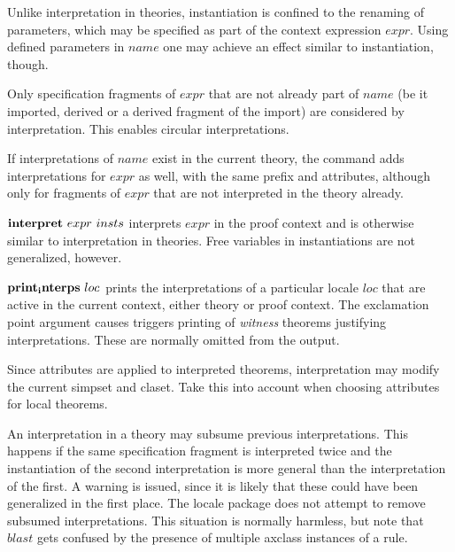 \begin{descr}
  Unlike interpretation in theories, instantiation is confined to the
  renaming of parameters, which may be specified as part of the context
  expression $expr$.  Using defined parameters in $name$ one may
  achieve an effect similar to instantiation, though.

  Only specification fragments of $expr$ that are not already part of
  $name$ (be it imported, derived or a derived fragment of the import)
  are considered by interpretation.  This enables circular
  interpretations.

  If interpretations of $name$ exist in the current theory, the
  command adds interpretations for $expr$ as well, with the same
  prefix and attributes, although only for fragments of $expr$ that
  are not interpreted in the theory already.

\item [${\mathord{\mathbf{interpret}}}~expr~insts$]
  interprets $expr$ in the proof context and is otherwise similar to
  interpretation in theories.  Free variables in instantiations are not
  generalized, however.

\item [${\mathord{\mathbf{print_interps}}}~loc$]
  prints the interpretations of a particular locale $loc$ that are
  active in the current context, either theory or proof context.  The
  exclamation point argument causes triggers printing of
  \emph{witness} theorems justifying interpretations.  These are
  normally omitted from the output.

  
\end{descr}

\begin{warn}
  Since attributes are applied to interpreted theorems, interpretation
  may modify the current simpset and claset.  Take this into
  account when choosing attributes for local theorems.
\end{warn}

\begin{warn}
  An interpretation in a theory may subsume previous interpretations.
  This happens if the same specification fragment is interpreted twice
  and the instantiation of the second interpretation is more general
  than the interpretation of the first.  A warning
  is issued, since it is likely that these could have been generalized
  in the first place.  The locale package does not attempt to remove
  subsumed interpretations.  This situation is normally harmless, but
  note that $blast$ gets confused by the presence of multiple axclass
  instances of a rule.
\end{warn}


